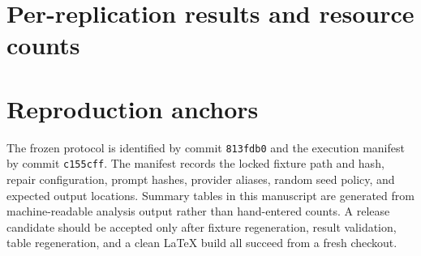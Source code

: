 \documentclass[11pt]{scrartcl}
\begin{document}
\section{Per-replication results and resource counts}
\label{app:tables}

\begin{table}[ht]
\centering

\caption{Final-check certified repairs in each complete replication.}
\label{tab:perrep}
\end{table}

\begin{table}[ht]
\centering

\caption{Confirmatory calls and token accounting for the two reported models,
including failed calls.  These totals cover the collected policy trajectories;
they are not an equal-cost comparison of E4 policies.}
\label{tab:cost}
\end{table}

\section{Reproduction anchors}
\label{app:reproduction}

The frozen protocol is identified by commit \texttt{813fdb0} and the execution
manifest by commit \texttt{c155cff}.  The manifest records the locked fixture
path and hash, repair configuration, prompt hashes, provider aliases, random
seed policy, and expected output locations.  Summary tables in this manuscript
are generated from machine-readable analysis output rather than hand-entered
counts.  A release candidate should be accepted only after fixture
regeneration, result validation, table regeneration, and a clean LaTeX build
all succeed from a fresh checkout.


\printbibliography
\end{document}
